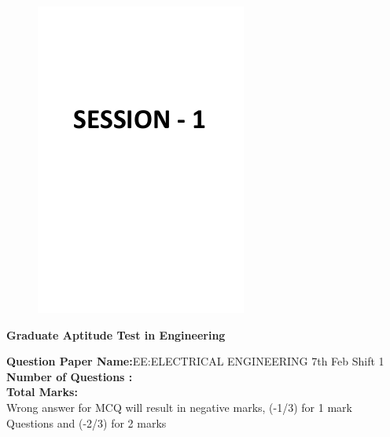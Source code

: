 \documentclass[a4paper,12pt]{exam}
\theoremstyle{remark}
\begin{document}
\begin{figure}[H]
    \centering
    \includegraphics[width=1\columnwidth]{figs/image1.png}
\end{figure}
\newpage
  \begin{center}
\textbf{ Graduate Aptitude Test in Engineering}
  \end{center}
\textbf{Question Paper Name:}\quad EE:ELECTRICAL ENGINEERING 7th Feb Shift 1\\
\textbf{Number of Questions   :}\\
\textbf{Total Marks:}\qquad \qquad {}\\
\vspace{0.5cm}
Wrong answer for MCQ will result in negative marks, (-1/3) for 1 mark Questions and (-2/3) for 2 marks \\
\end{document}
